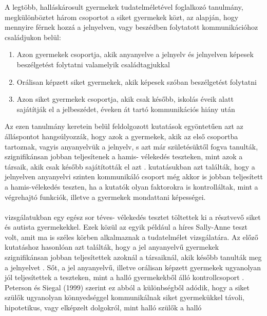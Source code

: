 A legtöbb, halláskárosult gyermekek tudatelméletével foglalkozó tanulmány, megkülönböztet
három csoportot a siket gyermekek közt, az alapján, hogy mennyire férnek hozzá a
jelnyelven, vagy beszédben folytatott kommunikációhoz családjukon belül:
\begin{enumerate}
	\item Azon gyermekek csoportja, akik anyanyelve a jelnyelv és jelnyelven képesek
	beszél\-getést folytatni valamelyik családtagjukkal
	\item Orálisan képzett siket gyermekek, akik képesek szóban beszélgetést folytatni
	\item Azon siket gyermekek csoportja, akik csak később, iskolás éveik alatt sajátítják el a
	jelbeszédet, éveken át tartó kommunikációs hiány után
\end{enumerate}
Az ezen tanulmány keretein belül feldolgozott kutatások egyöntetűen azt az álláspontot
hangsúlyozzák, hogy azok a gyermekek, akik az első csoportba tartoznak, vagyis anyanyelvük
a jelnyelv, s azt már születésüktől fogva tanulták, szignifikánsan jobban teljesítenek a hamis-
vélekedés teszteken, mint azok a társaik, akik csak később sajátították el azt \autocite{woolfe_want_siegal_2002,peterson_siegal_1999,peterson_slaughter_2006,schick_villiers_villiers_hoffmeister_2007}.
\textcite{woolfe_want_siegal_2002} kutatásukban azt találták, hogy a jelnyelven anyanyelvi
szinten kommunikáló csoport még akkor is jobban teljesített a hamis-vélekedés teszten, ha a
kutatók olyan faktorokra is kontrolláltak, mint a végrehajtó funkciók, illetve a gyermekek
mondattani képességei.\\
\\
 \textcite{peterson_siegal_1999} vizsgálatukban egy egész sor téves-
vélekedés tesztet töltettek ki a résztvevő siket és autista gyermekekkel. Ezek közül az egyik például a híres Sally-Anne teszt \autocite{baron-cohen_leslie_frith_1985} volt, amit ma is széles körben alkalmaznak a tudatelmélet vizsgálatára. Az előző kutatáshoz
hasonlóan azt találták, hogy a jel anyanyelvű gyermekek szignifikánsan jobban teljesítettek
azoknál a társaiknál, akik később tanulták meg a jelnyelvet \autocite{peterson_siegal_1999}. Sőt, a jel anyanyelvű,
illetve orálisan képzett gyermekek ugyanolyan jól teljesítettek a teszteken, mint a halló
gyermekekből álló kontrollcsoport \autocite{peterson_siegal_1999}. Peterson és Siegal (1999) szerint ez abból a
különbségből adódik, hogy a siket szülők ugyanolyan könnyedséggel kommunikálnak siket
gyermekükkel távoli, hipotetikus, vagy elképzelt dolgokról, mint halló szülők a halló
